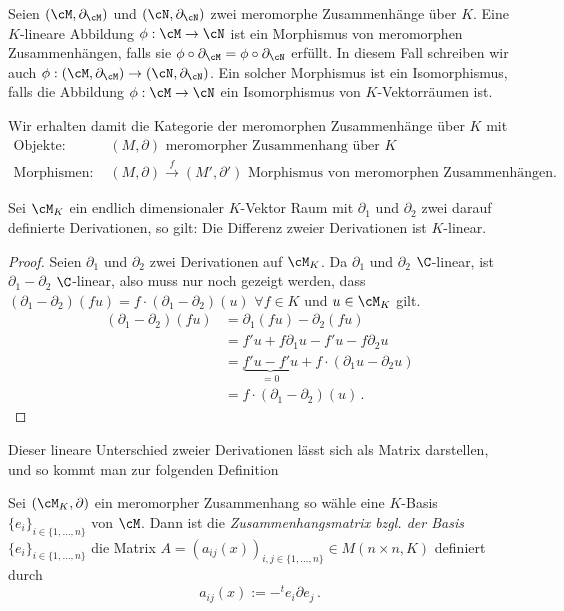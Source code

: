 \begin{defn}
Seien $(\cM,\partial_\cM)$ und $(\cN,\partial_\cN)$ zwei meromorphe
Zusammenhänge über $K$. Eine $K$-lineare Abbildung $\phi:\cM\rightarrow\cN$
ist ein Morphismus von meromorphen Zusammenhängen, falls sie
$\phi\circ\partial_\cM=\phi\circ\partial_\cN$ erfüllt. In diesem Fall
schreiben wir auch $\phi:(\cM,\partial_\cM)\rightarrow(\cN,\partial_\cN)$.
Ein solcher Morphismus ist ein Isomorphismus, falls die Abbildung
$\phi:\cM\rightarrow\cN$ ein Isomorphismus von $K$-Vektorräumen ist.
\end{defn}

\begin{comment}
TODO: entfernen
\end{comment}
\begin{defn}
Wir erhalten damit die Kategorie der meromorphen Zusammenhänge über $K$ mit
\begin{align*}
\text{Objekte: } & (M,\partial)\text{ meromorpher Zusammenhang über }K
\\\text{Morphismen: } & (M,\partial)\overset{f}{\rightarrow}(M',\partial')
\text{ Morphismus von meromorphen Zusammenhängen.}
\end{align*}
\end{defn}

\begin{lem} Sei $\cM_K$ ein endlich dimensionaler $K$-Vektor Raum mit
$\partial_1$ und $\partial_2$ zwei darauf definierte Derivationen, so gilt: Die
Differenz zweier Derivationen ist $K$-linear.
\end{lem}
\begin{proof}
Seien $\partial_1$ und $\partial_2$ zwei Derivationen auf $\cM_K$.
Da $\partial_1$ und $\partial_2$ $\C$-linear, ist $\partial_1-\partial_2$
$\C$-linear, also muss nur noch gezeigt werden, dass
$(\partial_1-\partial_2)(fu)=f\cdot(\partial_1-\partial_2)(u)$ $\forall f\in
K$ und $u\in\cM_K$ gilt.
\begin{align*}
(\partial_1-\partial_2)(fu) &= \partial_1(fu)-\partial_2(fu)\\
&= f'u+f\partial_1u-f'u-f\partial_2u\\
&= \underset{=0}{\underbrace{f'u-f'u}}+f\cdot(\partial_1u-\partial_2u)\\
&= f\cdot(\partial_1-\partial_2)(u) \,.
\end{align*}
\end{proof}
Dieser lineare Unterschied zweier Derivationen lässt sich als Matrix
darstellen, und so kommt man zur folgenden Definition
\begin{comment}
\cite[Seite 129]{hotta2007d}
\end{comment}
\begin{defn}[Zusammenhangsmatrix]
Sei $(\cM_K,\partial)$ ein meromorpher Zusammenhang so wähle eine $K$-Basis
$\{e_i\}_{i\in\{1,\dots,n\}}$ von $\cM$. Dann ist die
\emph{Zusammenhangsmatrix bzgl. der Basis $\{e_i\}_{i\in\{1,\dots,n\}}$} die
Matrix $A=(a_{ij}(x))_{i,j\in\{1,\dots,n\}}\in M(n\times n,K)$ definiert
durch
\[ 
a_{ij}(x) := -^te_i \partial e_j \,. 
\]
\end{defn}

